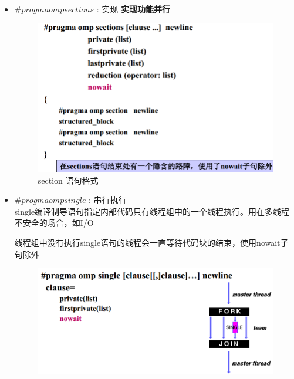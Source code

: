 \documentclass[UTF8,a4paper]{ctexart}
\begin{document}
\begin{itemize}
\begin{figure}[H]
  \end{figure}
  \item $\# progma omp sections$ : 实现 \textbf{实现功能并行}
  \begin{figure}[H]
    \centering
    \includegraphics[scale = 0.3]{assets/ParallelComputing_da662.png}
    \caption{section 语句格式}
  \end{figure}
  \item $\# progma omp single$ : 串行执行\\
  single编译制导语句指定内部代码只有线程组中的一个线程执行。用在多线程不安全的场合，如I/O

  线程组中没有执行single语句的线程会一直等待代码块的结束，使用nowait子句除外

  \begin{figure}[H]
    \centering
    \includegraphics[scale = 0.3]{assets/ParallelComputing_e8dd0.png}
  \end{figure}
\end{itemize}
\end{document}
